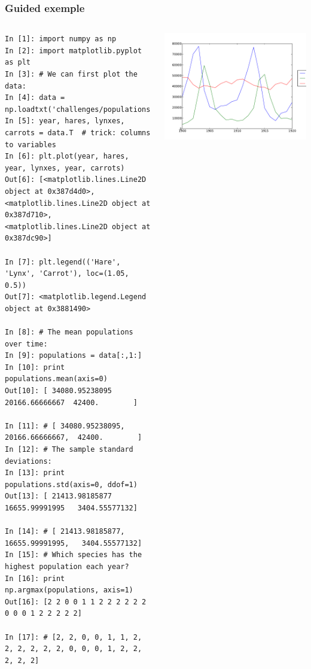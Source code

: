 \documentclass[colorlinks]{beamer}
\begin{document}
\begin{frame}[fragile]\frametitle{Guided exemple}
\begin{columns}[c]
\tiny
\begin{verbatim}
In [1]: import numpy as np 
In [2]: import matplotlib.pyplot as plt 
In [3]: # We can first plot the data: 
In [4]: data = np.loadtxt('challenges/populations.txt') 
In [5]: year, hares, lynxes, carrots = data.T  # trick: columns to variables 
In [6]: plt.plot(year, hares, year, lynxes, year, carrots) 
Out[6]: [<matplotlib.lines.Line2D object at 0x387d4d0>, <matplotlib.lines.Line2D object at 0x387d710>, <matplotlib.lines.Line2D object at 0x387dc90>]

In [7]: plt.legend(('Hare', 'Lynx', 'Carrot'), loc=(1.05, 0.5)) 
Out[7]: <matplotlib.legend.Legend object at 0x3881490>

In [8]: # The mean populations over time: 
In [9]: populations = data[:,1:] 
In [10]: print populations.mean(axis=0) 
Out[10]: [ 34080.95238095  20166.66666667  42400.        ]

In [11]: # [ 34080.95238095,  20166.66666667,  42400.        ] 
In [12]: # The sample standard deviations: 
In [13]: print populations.std(axis=0, ddof=1) 
Out[13]: [ 21413.98185877  16655.99991995   3404.55577132]

In [14]: # [ 21413.98185877,  16655.99991995,   3404.55577132] 
In [15]: # Which species has the highest population each year? 
In [16]: print np.argmax(populations, axis=1) 
Out[16]: [2 2 0 0 1 1 2 2 2 2 2 2 0 0 0 1 2 2 2 2 2]

In [17]: # [2, 2, 0, 0, 1, 1, 2, 2, 2, 2, 2, 2, 0, 0, 0, 1, 2, 2, 2, 2, 2] 
\end{verbatim}

\includegraphics[width=\textwidth]{plwfigis/CursP_2_figure6}

\end{columns}
\end{frame}
\end{document}
